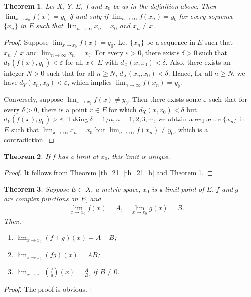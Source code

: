\documentclass[10pt]{book}
\newtheorem{theorem}{Theorem}[chapter]
\theoremstyle{definition}
\numberwithin{equation}{chapter}
\begin{document}
\begin{theorem}\label{th_31}
Let $X$, $Y$, $E$, $f$ and $x_0$ be as in the definition above. Then $\lim_{x \to x_0} f(x) = y_0$ if and only if $\lim_{n \to \infty} f(x_n) = y_0$ for every sequence $\{x_n\}$ in $E$ such that $\lim_{n\to\infty} x_n = x_0$ and $x_n \neq x$.
\end{theorem}
\begin{proof}
Suppose $\lim_{x \to x_0} f(x) = y_0$. Let $\{x_n\}$ be a sequence in $E$ such that $x_n \neq x$ and $\lim_{n\to\infty} x_n = x_0$. For every $\varepsilon > 0$, there exists $\delta > 0$ such that $d_Y(f(x),y_0) < \varepsilon$ for all $x \in E$ with $d_X(x,x_0) < \delta$. Also, there exists an integer $N > 0$ such that for all $n \geq N$, $d_X(x_n,x_0) < \delta$. Hence, for all $n \geq N$, we have $d_Y(x_n,x_0) < \varepsilon$, which implies $\lim_{n \to \infty} f(x_n) = y_0$.

Conversely, suppose $\lim_{x \to x_0} f(x) \neq y_0$. Then there exists some $\varepsilon$ such that for every $\delta > 0$, there is a point $x \in E$ for which $d_X(x,x_0) < \delta$ but $d_Y(f(x),y_0) > \varepsilon$. Taking $\delta = 1/n, n = 1,2,3,\cdots$, we obtain a sequence $\{x_n\}$ in $E$ such that $\lim_{n\to\infty} x_n = x_0$ but $\lim_{n\to\infty} f(x_n) \neq y_0$, which is a contradiction.
\end{proof}

\medskip

\begin{theorem}
If $f$ has a limit at $x_0$, this limit is unique. 
\end{theorem}
\begin{proof}
It follows from Theorem \ref{th_21} \ref{th_21_b} and Theorem \ref{th_31}.
\end{proof}

\medskip

\begin{theorem}
Suppose $E \subset X$, a metric space, $x_0$ is a limit point of $E$. $f$ and $g$ are complex functions on $E$, and
\begin{align*}
    \lim_{x\to x_0} f(x) = A, \quad \lim_{x\to x_0} g(x) = B.
\end{align*}
Then,
\begin{enumerate}[label=(\alph*)]
    \item $\lim_{x\to x_0} (f + g)(x) = A + B$;
    
    \item $\lim_{x\to x_0} (fg)(x) = AB$;
    
    \item $\lim_{x\to x_0} \displaystyle \left(\frac{f}{g}\right)(x) = \frac{A}{B}$, if $B \neq 0$.
\end{enumerate}
\end{theorem}
\begin{proof}
The proof is obvious.
\end{proof}
\end{document}
